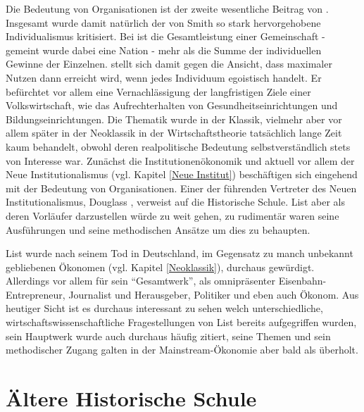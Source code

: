 Die Bedeutung von Organisationen ist der zweite wesentliche Beitrag von \textcite{List1841}. Insgesamt wurde damit natürlich der von Smith so stark hervorgehobene Individualismus kritisiert. Bei \textcite{List1841} ist die Gesamtleistung einer Gemeinschaft - gemeint wurde dabei eine Nation - mehr als die Summe der individuellen Gewinne der Einzelnen.  \textcite{List1841} stellt sich damit gegen die Ansicht, dass maximaler Nutzen dann erreicht wird, wenn jedes Individuum egoistisch handelt. Er befürchtet vor allem eine Vernachlässigung der langfristigen Ziele einer Volkswirtschaft, wie das Aufrechterhalten von Gesundheitseinrichtungen und Bildungseinrichtungen. Die Thematik wurde in der Klassik, vielmehr aber vor allem später in der Neoklassik in der Wirtschaftstheorie tatsächlich lange Zeit kaum behandelt, obwohl deren realpolitische Bedeutung selbstverständlich stets von Interesse war. Zunächst die Institutionenökonomik und aktuell vor allem der Neue Institutionalismus (vgl. Kapitel \ref{Neue Institut}) beschäftigen sich eingehend mit der Bedeutung von Organisationen. Einer der führenden Vertreter des Neuen Institutionalismus, Douglass \textcite[S. 99]{North1991}, verweist auf die Historische Schule. List aber als deren Vorläufer darzustellen würde zu weit gehen, zu rudimentär waren seine Ausführungen und seine methodischen Ansätze um dies zu behaupten.

List wurde nach seinem Tod in Deutschland, im Gegensatz zu manch unbekannt gebliebenen Ökonomen (vgl. Kapitel \ref{Neoklassik}), durchaus gewürdigt. Allerdings vor allem für sein "`Gesamtwerk"', als omnipräsenter Eisenbahn-Entrepreneur, Journalist und Herausgeber, Politiker und eben auch Ökonom. Aus heutiger Sicht ist es durchaus interessant zu sehen welch unterschiedliche, wirtschaftswissenschaftliche Fragestellungen von List bereits aufgegriffen wurden, sein Hauptwerk \textcite{List1841} wurde auch durchaus häufig zitiert, seine Themen und sein methodischer Zugang galten in der Mainstream-Ökonomie aber bald als überholt.

\section{Ältere Historische Schule}
\label{Hist_Schulen}

